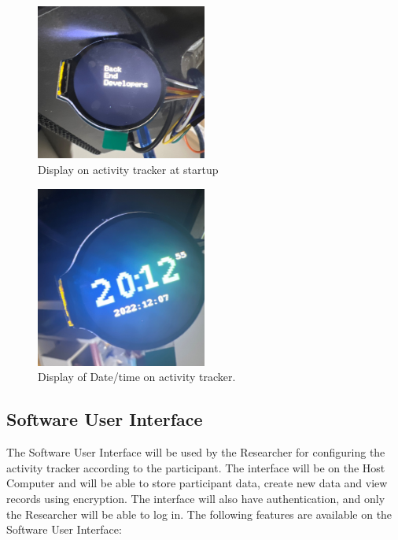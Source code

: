 \documentclass[12pt, titlepage]{article}
\begin{document}
\begin{figure}[H]
	\begin{center}
		 \includegraphics[width=0.5\textwidth]{BEDDisplay}
		\caption{Display on activity tracker at startup}
		\label{BEDDisplay} 
	\end{center}
\end{figure}

\begin{figure}[H]
	\begin{center}
		 \includegraphics[width=0.5\textwidth]{DisplayTime}
		\caption{Display of Date/time on activity tracker.}
		\label{DisplayTime} 
	\end{center}
\end{figure}

\subsection{Software User Interface}

The Software User Interface will be used by the Researcher for configuring the activity tracker according to the participant. The interface will be on the Host Computer and will be able to store participant data, create new data and view records using encryption. The interface will also have authentication, and only the Researcher will be able to log in. The following features are available on the Software User Interface:
\end{document}
